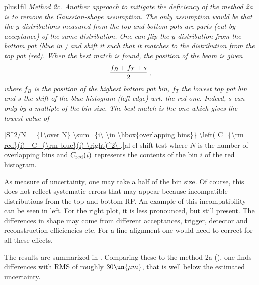
\bmfig
\vbox{\noindent{} plus1fil
\em{Method 2c}. Another approach to mitigate the deficiency of the method 2a is to remove the Gaussian-shape assumption. The only assumption would be that the $y$ distributions measured from the top and bottom pots are parts (cut by acceptance) of the same distribution. One can flip the $y$ distribution from the bottom pot (blue in ) and shift it such that it matches to the distribution from the top pot (red). When the best match is found, the position of the beam is given
$${f_B + f_T + s\over 2}\ ,$$
where $f_B$ is the position of the highest bottom pot bin, $f_T$ the lowest top pot bin and $s$ the shift of the blue histogram (left edge) wrt. the red one. Indeed, $s$ can only by a multiple of the bin size. The best match is the one which gives the lowest value of
}%
%
\emfig

\eqref{S^2/N = {1\over N} \sum_{i\ \in \hbox{overlapping bins}} \left( C_{\rm red}(i) - C_{\rm blue}(i) \right)^2\ ,}{al el shift test}
where $N$ is the number of overlapping bins and $C_{\rm red}(i)$ represents the contents of the bin $i$ of the red histogram.


As measure of uncertainty, one may take a half of the bin size. Of course, this does not reflect systematic errors that may appear because incompatible distributions from the top and bottom RP. An example of this incompatibility can be seen in  left. For the right plot, it is less pronounced, but still present. The differences in shape may come from different acceptances, trigger, detector and reconstruction efficiencies etc. For a fine alignment one would need to correct for all these effects.

The results are summarized in . Comparing these to the method 2a (), one finds differences with RMS of roughly $30\un{\mu m}$, that is well below the estimated uncertainty.

